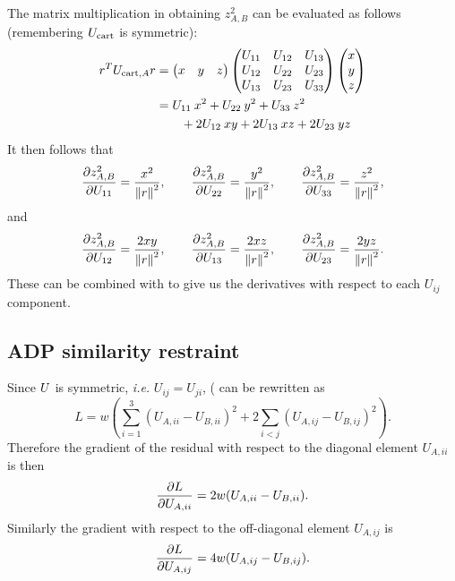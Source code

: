 \documentclass[pdf]{iucr}
\begin{document}
The matrix multiplication in obtaining $z^2_{A,B}$ can be evaluated as follows
(remembering $U_{\text{cart}}$ is symmetric):
\begin{align}
r^TU_{\text{cart},A}r &= 
\begin{pmatrix} x & y & z \end{pmatrix}
\begin{pmatrix} U_{11} & U_{12} & U_{13}\\
  U_{12} & U_{22} & U_{23}\\
  U_{13} & U_{23} & U_{33}\end{pmatrix}
\begin{pmatrix} x\\y\\z\end{pmatrix}\\
&= U_{11}\: x^2 + U_{22}\: y^2 + U_{33}\: z^2 \nonumber \\
&\qquad  + 2U_{12}\: xy + 2U_{13}\: xz + 2U_{23}\: yz
\end{align}
It then follows that
\begin{equation}
\frac{\partial z^2_{A,B}}{\partial U_{11}} = \frac{x^2}{\left\| r \right\|^2} ,\qquad
\frac{\partial z^2_{A,B}}{\partial U_{22}} = \frac{y^2}{\left\| r \right\|^2} ,\qquad
\frac{\partial z^2_{A,B}}{\partial U_{33}} = \frac{z^2}{\left\| r \right\|^2} ,
\end{equation}
and
\begin{equation}
\frac{\partial z^2_{A,B}}{\partial U_{12}} = \frac{2xy}{\left\| r \right\|^2} ,\qquad
\frac{\partial z^2_{A,B}}{\partial U_{13}} = \frac{2xz}{\left\| r \right\|^2} ,\qquad
\frac{\partial z^2_{A,B}}{\partial U_{23}} = \frac{2yz}{\left\| r \right\|^2} .
\end{equation}
These can be combined with  to give us the derivatives
with respect to each $U_{ij}$ component.


\subsection{ADP similarity restraint}

Since $U$ is symmetric, \emph{i.e.} $U_{ij} = U_{ji}$, ( can be rewritten as
\begin{equation}
L = w \left( \sum_{i=1}^3 (U_{A,ii} - U_{B,ii})^2 + 2 \sum_{i < j} (U_{A,ij} - U_{B,ij})^2 \right) .
\end{equation}
Therefore the gradient of the residual with respect to the diagonal element $U_{A,ii}$ is then
\begin{equation}
\frac{\partial L}{\partial U_{A,ii}} = 2w(U_{A,ii} - U_{B,ii}).
\end{equation}
Similarly the gradient with respect to the off-diagonal element $U_{A,ij}$ is
\begin{equation}
\frac{\partial L}{\partial U_{A,ij}} = 4w(U_{A,ij} - U_{B,ij}).
\end{equation}
\end{document}
